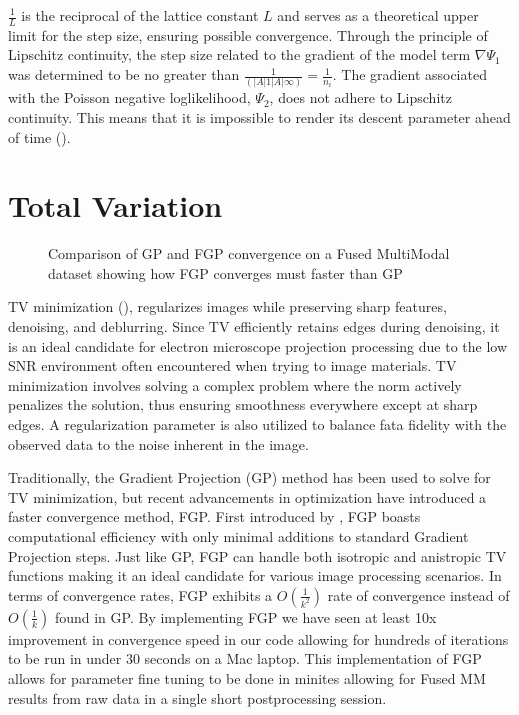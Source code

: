 \documentclass[letterpaper,10pt,english]{jupyterBook}
\let\sphinxpxdimen\pdfpxdimen\else\newdimen\sphinxpxdimen
\begin{document}
\sphinxAtStartPar
\(\frac{1}{L}\) is the reciprocal of the lattice constant \(L\) and serves as a theoretical upper limit for the step size, ensuring possible convergence. Through the principle of Lipschitz continuity, the step size related to the gradient of the model term \(\nabla \Psi_1\) was determined to be no greater than \(\frac{1}{(| A |1 | A |{\infty})} = \frac{1}{n_i}\). The gradient associated with the Poisson negative log\sphinxhyphen{}likelihood, \(\Psi_2\), does not adhere to Lipschitz continuity.  This means that it is impossible to render its descent parameter ahead of time ({\hyperref[\detokenize{02_math:10.1109/TIP.2008.2008223}]{}}).


\chapter{Total Variation}
\label{\detokenize{02_math:total-variation}}
\begin{figure}[htbp]
\centering
\capstart

\noindent\sphinxincludegraphics[width=700\sphinxpxdimen]{{Figure_2_TV_Comparison}.png}
\caption{Comparison of GP and FGP convergence on a Fused Multi\sphinxhyphen{}Modal dataset showing how FGP converges must faster than GP}\label{\detokenize{02_math:fig-tv}}\end{figure}

\sphinxAtStartPar
TV minimization (), regularizes images while preserving sharp features, denoising, and deblurring. Since TV efficiently retains edges during denoising, it is an ideal candidate for electron microscope projection processing due to the low SNR environment often encountered when trying to image materials. TV minimization involves solving a complex problem where the norm actively penalizes the solution, thus ensuring smoothness everywhere except at sharp edges.  A regularization parameter is also utilized to balance fata fidelity with the observed data to the noise inherent in the image.

\sphinxAtStartPar
Traditionally, the Gradient Projection (GP) method has been used to solve for TV minimization, but recent advancements in optimization have introduced a faster convergence method, FGP. First introduced by {\hyperref[\detokenize{02_math:10.1109/TIP.2009.2028250}]{}}, FGP boasts computational efficiency with only minimal additions to standard Gradient Projection steps.  Just like GP, FGP can handle both isotropic and anistropic TV functions making it an ideal candidate for various image processing scenarios.  In terms of convergence rates, FGP exhibits a \(O\left(\frac{1}{k^2}\right)\) rate of convergence instead of \(O\left(\frac{1}{k}\right)\) found in GP. By implementing FGP we have seen at least 10x improvement in convergence speed in our code allowing for hundreds of iterations to be run in under 30 seconds on a Mac laptop. This implementation of FGP allows for parameter fine tuning to be done in minites allowing for Fused MM results from raw data in a single short post\sphinxhyphen{}processing session.
\end{document}
